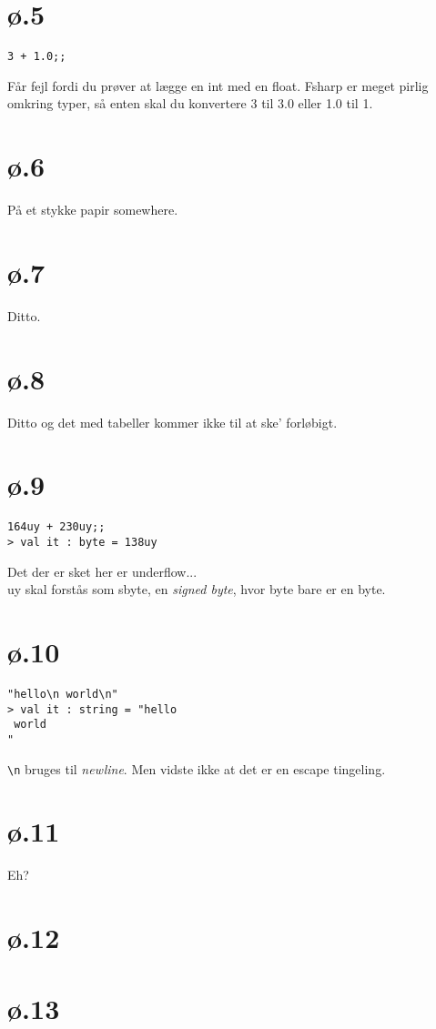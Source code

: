\documentclass[a4paper]{article}
\newcommand*{\escape}[1]{\texttt{\textbackslash#1}}
\begin{document}
\section{ø.5}
\begin{lstlisting}
3 + 1.0;;
\end{lstlisting}
Får fejl fordi du prøver at lægge en int med en float. Fsharp er meget pirlig omkring typer, så enten skal du konvertere 3 til 3.0 eller 1.0 til 1.

\section{ø.6}
På et stykke papir somewhere.

\section{ø.7}
Ditto.

\section{ø.8}
Ditto og det med tabeller kommer ikke til at ske' forløbigt. 

\section{ø.9}
\begin{lstlisting}
164uy + 230uy;;
> val it : byte = 138uy
\end{lstlisting}
Det der er sket her er underflow...\\
uy skal forstås som sbyte, en \textit{signed byte}, hvor byte bare er en byte.

\section{ø.10}
\begin{lstlisting}
"hello\n world\n"
> val it : string = "hello
 world
"
\end{lstlisting}
\escape{n} bruges til \textit{newline}. Men vidste ikke at det er en escape tingeling. 

\section{ø.11}
Eh?

\section{ø.12}


\section{ø.13}
\end{document}
